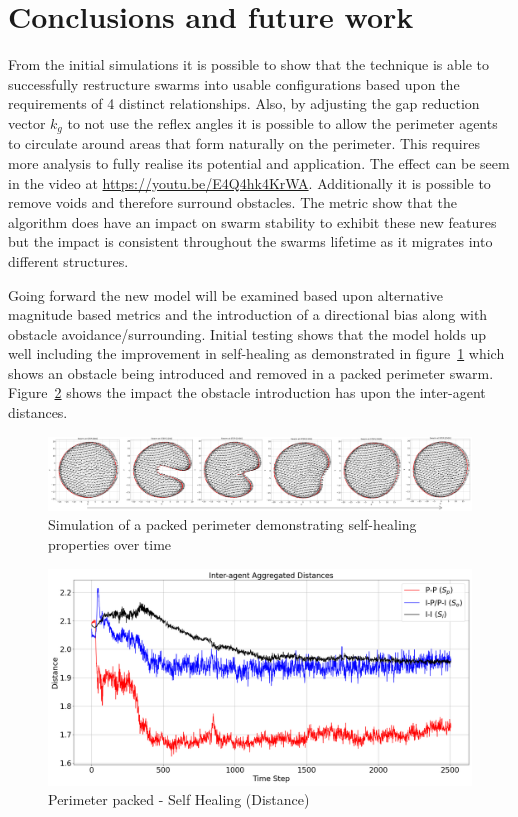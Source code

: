 \documentclass[12pt,a4paper]{IEEEtran}
\newcommand{\kg}{\mathit{k_{g}}}
\begin{document}
\section{Conclusions and future work}\label{conclusions}
From the initial simulations it is possible to show that the technique is able to successfully restructure swarms into usable configurations based upon the requirements of 4 distinct relationships. Also, by adjusting the gap reduction vector $\kg$ to not use the reflex angles it is possible to allow the perimeter agents to circulate around areas that form naturally on the perimeter. This requires more analysis to fully realise its potential and application. The effect can be seem in the video at \url{https://youtu.be/E4Q4hk4KrWA}. Additionally it is possible to remove voids and therefore surround obstacles. The metric show that the algorithm does have an impact on swarm stability to exhibit these new features but the impact is consistent throughout the swarms lifetime as it migrates into different structures.

Going forward the new model will be examined based upon alternative magnitude based metrics and the introduction of a directional bias along with obstacle avoidance/surrounding. Initial testing shows that the model holds up well including the improvement in self-healing as demonstrated in figure~\ref{fig:packedSelfHealing} which shows an obstacle being introduced and removed in a packed perimeter swarm. Figure~\ref{fig:future8} shows the impact the obstacle introduction has upon the inter-agent distances.

\begin{figure}[!ht]
  \begin{center}
    \includegraphics[width=17.6cm]{figures/FutureTime}
  \end{center}
  \caption{Simulation of a packed perimeter demonstrating self-healing properties over time\label{fig:packedSelfHealing}}
\end{figure}

\begin{figure}[H]
	\begin{center}
		\includegraphics[width=1.0\linewidth]{figures/Future8}
	\end{center}
	\caption{Perimeter packed - Self Healing (Distance)\label{fig:future8}}
\end{figure}



\end{document}

